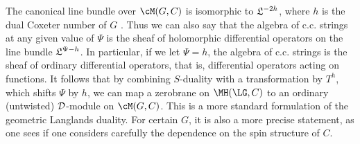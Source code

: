 The canonical line bundle over $\cM(G,C)$ is isomorphic to ${\frak
L}^{-2h}$, where $h$ is the dual Coxeter number of $G$
\cite{ref141} . Thus we can also say that the algebra of c.c.
strings at any given value of $\Psi$ is the sheaf of holomorphic
differential operators on the line bundle ${\frak L}^{\Psi-h}$. In
particular, if we let $\Psi =h$, the algebra of c.c. strings is
the sheaf of ordinary differential operators, that is,
differential operators acting on functions. It follows that by
combining $S$-duality with a transformation by $T^h$, which shifts
$\Psi$ by $h$, we can map a zerobrane on $\MH(\LG,C)$ to an
ordinary (untwisted) ${\cal D}$-module on $\cM(G,C)$. This is a
more standard formulation of the geometric Langlands duality. For
certain $G$, it is also a more precise statement, as one sees if
one considers carefully \cite{ref5,ref26} the dependence on the
spin structure of $C$.
